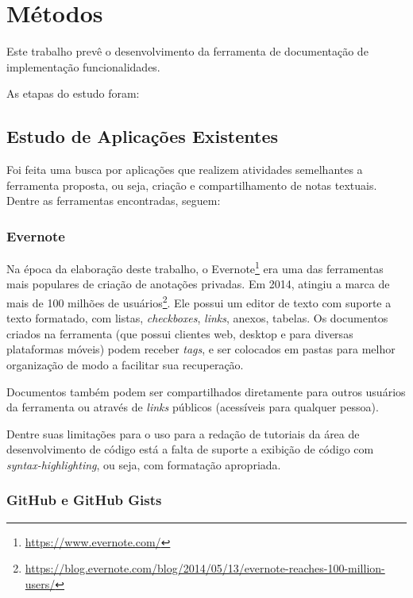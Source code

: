 \chapter{Métodos}

Este trabalho prevê o desenvolvimento da ferramenta de documentação de implementação funcionalidades.


As etapas do estudo foram:

\section{Estudo de Aplicações Existentes}

Foi feita uma busca por aplicações que realizem atividades semelhantes a ferramenta proposta, ou seja, criação e compartilhamento de notas textuais. Dentre as ferramentas encontradas, seguem:

\subsection{Evernote}

Na época da elaboração deste trabalho, o Evernote\footnote{\url{https://www.evernote.com/}} era uma das ferramentas mais populares de criação de anotações privadas. Em 2014, atingiu a marca de mais de 100 milhões de usuários\footnote{\url{https://blog.evernote.com/blog/2014/05/13/evernote-reaches-100-million-users/}}. Ele possui um editor de texto com suporte a texto formatado, com listas, \textit{checkboxes}, \textit{\textit{links}}, anexos, tabelas. Os documentos criados na ferramenta (que possui clientes web, desktop e para diversas plataformas móveis) podem receber \textit{tags}, e ser colocados em pastas para melhor organização de modo a facilitar sua recuperação.


Documentos também podem ser compartilhados diretamente para outros usuários da ferramenta ou através de \textit{links} públicos (acessíveis para qualquer pessoa).

Dentre suas limitações para o uso para a redação de tutoriais da área de desenvolvimento de código está a falta de suporte a exibição de código com \textit{syntax-highlighting}, ou seja, com formatação apropriada.


\subsection{GitHub e GitHub Gists}

